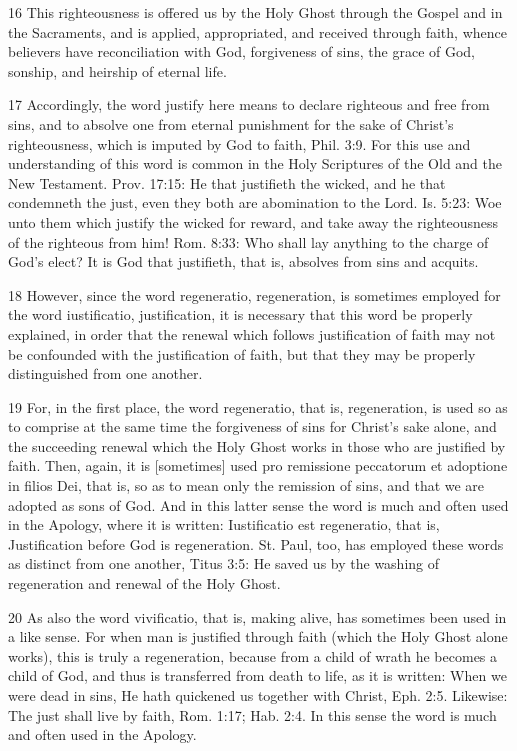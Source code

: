 16 This righteousness is offered us by the Holy Ghost through the Gospel and in the Sacraments, and is applied, appropriated, and received through faith, whence believers have reconciliation with God, forgiveness of sins, the grace of God, sonship, and heirship of eternal life.

17 Accordingly, the word justify here means to declare righteous and free from sins, and to absolve one from eternal punishment for the sake of Christ’s righteousness, which is imputed by God to faith, Phil. 3:9. For this use and understanding of this word is common in the Holy Scriptures of the Old and the New Testament. Prov. 17:15: He that justifieth the wicked, and he that condemneth the just, even they both are abomination to the Lord. Is. 5:23: Woe unto them which justify the wicked for reward, and take away the righteousness of the righteous from him! Rom. 8:33: Who shall lay anything to the charge of God’s elect? It is God that justifieth, that is, absolves from sins and acquits.

18 However, since the word regeneratio, regeneration, is sometimes employed for the word iustificatio, justification, it is necessary that this word be properly explained, in order that the renewal which follows justification of faith may not be confounded with the justification of faith, but that they may be properly distinguished from one another.

19 For, in the first place, the word regeneratio, that is, regeneration, is used so as to comprise at the same time the forgiveness of sins for Christ’s sake alone, and the succeeding renewal which the Holy Ghost works in those who are justified by faith. Then, again, it is [sometimes] used pro remissione peccatorum et adoptione in filios Dei, that is, so as to mean only the remission of sins, and that we are adopted as sons of God. And in this latter sense the word is much and often used in the Apology, where it is written: Iustificatio est regeneratio, that is, Justification before God is regeneration. St. Paul, too, has employed these words as distinct from one another, Titus 3:5: He saved us by the washing of regeneration and renewal of the Holy Ghost.

20 As also the word vivificatio, that is, making alive, has sometimes been used in a like sense. For when man is justified through faith (which the Holy Ghost alone works), this is truly a regeneration, because from a child of wrath he becomes a child of God, and thus is transferred from death to life, as it is written: When we were dead in sins, He hath quickened us together with Christ, Eph. 2:5. Likewise: The just shall live by faith, Rom. 1:17; Hab. 2:4. In this sense the word is much and often used in the Apology.

